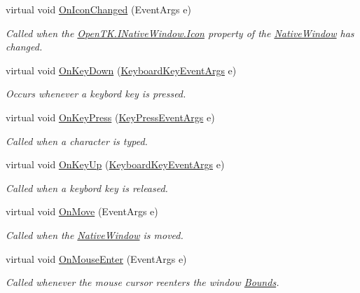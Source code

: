 \begin{DoxyCompactItemize}
virtual void \hyperlink{class_open_t_k_1_1_native_window_a0c90b5dd60dc3e2fea5ed2dcfd1c5094}{On\-Icon\-Changed} (Event\-Args e)
\begin{DoxyCompactList}\small\item\em Called when the \hyperlink{interface_open_t_k_1_1_i_native_window_a16cffc51a5dd62c9d9dbf9a089620754}{Open\-T\-K.\-I\-Native\-Window.\-Icon} property of the \hyperlink{class_open_t_k_1_1_native_window}{Native\-Window} has changed. \end{DoxyCompactList}\item 
virtual void \hyperlink{class_open_t_k_1_1_native_window_a8f2fad3b2f39c318249bd9fa0fc18e39}{On\-Key\-Down} (\hyperlink{class_open_t_k_1_1_input_1_1_keyboard_key_event_args}{Keyboard\-Key\-Event\-Args} e)
\begin{DoxyCompactList}\small\item\em Occurs whenever a keybord key is pressed. \end{DoxyCompactList}\item 
virtual void \hyperlink{class_open_t_k_1_1_native_window_a0fa29d091481aff3ea935c77f2b44f1e}{On\-Key\-Press} (\hyperlink{class_open_t_k_1_1_key_press_event_args}{Key\-Press\-Event\-Args} e)
\begin{DoxyCompactList}\small\item\em Called when a character is typed. \end{DoxyCompactList}\item 
virtual void \hyperlink{class_open_t_k_1_1_native_window_a2c7356d198a60fccde5ff9c92f3b58c6}{On\-Key\-Up} (\hyperlink{class_open_t_k_1_1_input_1_1_keyboard_key_event_args}{Keyboard\-Key\-Event\-Args} e)
\begin{DoxyCompactList}\small\item\em Called when a keybord key is released. \end{DoxyCompactList}\item 
virtual void \hyperlink{class_open_t_k_1_1_native_window_aef0cbd0985015518ddc11c6ef11ab360}{On\-Move} (Event\-Args e)
\begin{DoxyCompactList}\small\item\em Called when the \hyperlink{class_open_t_k_1_1_native_window}{Native\-Window} is moved. \end{DoxyCompactList}\item 
virtual void \hyperlink{class_open_t_k_1_1_native_window_a2326c87203682e745505d2eee19ccd16}{On\-Mouse\-Enter} (Event\-Args e)
\begin{DoxyCompactList}\small\item\em Called whenever the mouse cursor reenters the window \hyperlink{class_open_t_k_1_1_native_window_ac0325973134062eba62484df45236464}{Bounds}. \end{DoxyCompactList}\item 

\end{DoxyCompactItemize}
